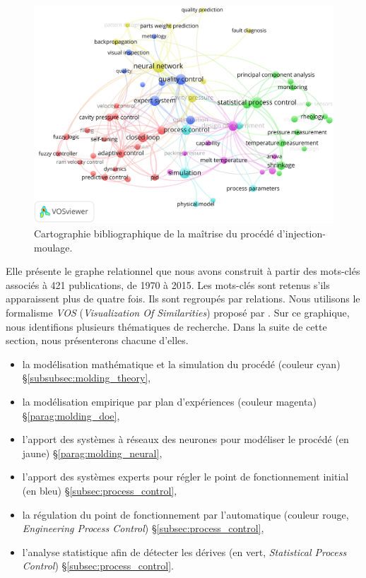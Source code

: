 \begin{figure}[bhtp]
	\centering
	\includegraphics[width=\textwidth,height=\textheight,keepaspectratio]{../Chap1/Figures/tagMapFinalPubliOccurence.jpg}
	\caption{Cartographie bibliographique de la maîtrise du procédé d'injection-moulage.}
	\label{fig:cartographie}
\end{figure}

Elle présente le graphe relationnel que nous avons construit à partir des mots-clés associés à 421 publications, de 1970 à 2015.
Les mots-clés sont retenus s’ils apparaissent plus de quatre fois.
Ils sont regroupés par relations.
Nous utilisons le formalisme \textit{VOS} (\textit{Visualization Of Similarities}) proposé par \citeauthor{vaneck_vos_2006} \cite{vaneck_vos_2006, van_eck_comparison_2010}.
Sur ce graphique, nous identifions plusieurs thématiques de recherche.
Dans la suite de cette section, nous présenterons chacune d'elles.

\begin{itemize}
	\item la modélisation mathématique et la simulation du procédé (couleur cyan) §\ref{subsubsec:molding_theory},
	\item la modélisation empirique par plan d'expériences (couleur magenta) §\ref{parag:molding_doe},
	\item l’apport des systèmes à réseaux des neurones pour modéliser le procédé (en jaune) §\ref{parag:molding_neural},
	\item l’apport des systèmes experts pour régler le point de fonctionnement initial (en bleu) §\ref{subsec:process_control},
	\item la régulation du point de fonctionnement par l'automatique (couleur rouge, \textit{Engineering Process Control}) §\ref{subsec:process_control},
	\item l’analyse statistique afin de détecter les dérives (en vert, \textit{Statistical Process Control}) §\ref{subsec:process_control}.
\end{itemize}

